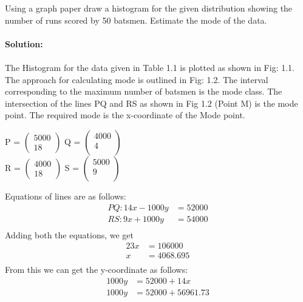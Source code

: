 \documentclass[12pt, a4paper] {article}
\begin{document}
\begin{multicols*}{2}
Using a graph paper draw a histogram for the given distribution showing the number of runs scored by 50 batsmen. Estimate the mode of the data.\\\\


\textbf{Solution: }\\\\
The Histogram for the data given in Table 1.1 is plotted as shown in Fig: 1.1. \\
The approach for calculating mode is outlined in Fig: 1.2. The interval corresponding to the maximum number of batsmen is the mode class. The intersection of the lines PQ and RS as shown in Fig 1.2 (Point M) is the mode point. The required mode is the x-coordinate of the Mode point.\\
\begin{center}
P =
$\begin{pmatrix}
  5000\\
  18
\end{pmatrix}$ 
Q =
$\begin{pmatrix}
  4000\\
  4\\
\end{pmatrix}$ 
\\
R =
$\begin{pmatrix}
  4000\\
  18
\end{pmatrix}$ 
S =
$\begin{pmatrix}
  5000\\
  9\\
\end{pmatrix}$ \\
\end{center}
Equations of lines are as follows:\\
\begin{align*} 
PQ : 14x - 1000y &=  52000 \\ RS : 9x + 1000y &=  54000 \\
\end{align*}
Adding both the equations, we get
\begin{align*}
23x &= 106000 \\
x &= 4068.695 \\
\end{align*}
From this we can get the y-coordinate as follows:
\begin{align*}
1000y &=  52000 + 14x \\
1000y &=  52000 + 56961.73 \\

\end{align*}
\end{multicols*}
\end{document}
